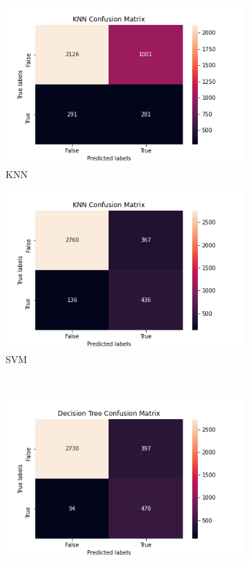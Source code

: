 \documentclass{article}
\begin{document}
\begin{figure}[H]
\begin{subfigure}{.5\linewidth}
\centering
\includegraphics[scale=0.4]{KNN_over_confusionMatrix.png}
\caption{KNN}
\label{fig:knnMatrix_over}
\end{subfigure}%
\begin{subfigure}{.5\linewidth}
\centering
\includegraphics[scale=0.4]{SVM_over_confusionMatrix.png}
\caption{SVM}
\label{fig:svmMatrix_over}
\end{subfigure}\\[1ex]
\begin{subfigure}{.5\linewidth}
\centering
\includegraphics[scale=0.4]{DecisionTree_over_confusionMatrix.png}

\end{subfigure}
\end{figure}
\end{document}
